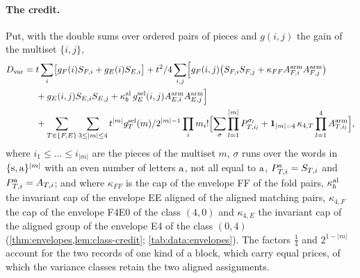 \paragraph{The credit.}
Put, with the double sums over ordered pairs of pieces and $g(i,j)$ the gain of
the multiset $\{i,j\}$,
\begin{equation}\label{eq:variance:dvar}
\begin{split}
 D_{\rm var}={}&t\sum_i\bigl[g_F(i)S_{F,i}+g_E(i)S_{E,i}\bigr]
 +t^2/4\sum_{i,j}\Bigl[g_F(i,j)\bigl(S_{F,i}S_{F,j}
 +\kappa_{FF}A^{\rm arm}_{F,i}A^{\rm arm}_{F,j}\bigr)\\
 &+g_E(i,j)S_{E,i}S_{E,j}
 +\kappa^{\rm al}_b\,g^{\rm sel}_E(i,j)A^{\rm arm}_{E,i}A^{\rm arm}_{E,j}\Bigr]\\
 &+\sum_{T\in\{F,E\}}\sum_{3\le|m|\le4}t^{|m|}g^{\rm sel}_T(m)/2^{|m|-1}\prod_im_i!
 \Bigl[\sum_\sigma\prod_{l=1}^{|m|}P^{\sigma_l}_{T,i_l}
 +\mathbf 1_{|m|=4}\,\kappa_{4,T}\prod_{l=1}^4A^{\rm arm}_{T,i_l}\Bigr],
\end{split}
\end{equation}
where $i_1\le\dots\le i_{|m|}$ are the pieces of the multiset $m$, $\sigma$ runs
over the words in $\{{\rm s},{\rm a}\}^{|m|}$ with an even number of letters ${\rm a}$,
not all equal to ${\rm a}$, $P^{\rm s}_{T,i}=S_{T,i}$ and $P^{\rm a}_{T,i}=A_{T,i}$;
and where $\kappa_{FF}$ is the cap of the envelope FF of the fold pairs,
$\kappa^{\rm al}_b$ the invariant cap of the envelope EE aligned of the aligned
matching pairs, $\kappa_{4,F}$ the cap of the envelope F4E0 of the class $(4,0)$
and $\kappa_{4,E}$ the invariant cap of the aligned group of the envelope E4 of
the class $(0,4)$ (\cref{thm:envelopes,lem:class-credit}; \cref{tab:data:envelopes}). The factors
$\frac14$ and $2^{1-|m|}$ account for the two records of one kind of a block,
which carry equal prices, of which the variance classes retain the two aligned
assignments.

